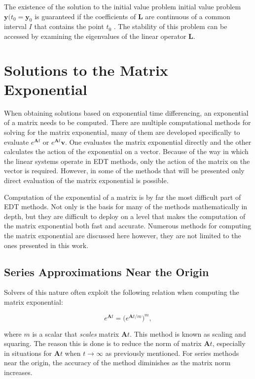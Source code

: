 The existence of the solution to the initial value problem initial value problem $\boldsymbol{y}(t_{0} = \boldsymbol{y}_{0}$ is guaranteed if the coefficients of $\boldsymbol{L}$ are continuous of a common interval $I$ that contains the point $t_{0}$ \cite{zill2012}. The stability of this problem can be accessed by examining the eigenvalues of the linear operator $\boldsymbol{L}$. 

\section{Solutions to the Matrix Exponential}
When obtaining solutions based on exponential time differencing, an exponential of a matrix needs to be computed. There are multiple computational methods for solving for the matrix exponential, many of them are developed specifically to evaluate $e^{\boldsymbol{A}t}$ or $e^{\boldsymbol{A}t}\boldsymbol{v}$. One evaluates the matrix exponential directly and the other calculates the action of the exponential on a vector. Because of the way in which the linear systems operate in EDT methods,  only the action of the matrix on the vector is required. However, in some of the methods that will be presented only direct evaluation of the matrix exponential is possible. 

Computation of the exponential of a matrix is by far the most difficult part of EDT methods. Not only is the basis for many of the methods mathematically in depth, but they are difficult to deploy on a level that makes the computation of the matrix exponential both fast and accurate. Numerous methods for computing the matrix exponential are discussed here however, they are not limited to the ones presented in this work. 

\subsection{Series Approximations Near the Origin} \label{subsec:seriesapprox}
Solvers of this nature often exploit the following relation when computing the matrix exponential:

\begin{equation}
    e^{\boldsymbol{A}t} = \big(e^{\boldsymbol{A}t/m}\big)^{m},
\end{equation}

\noindent where $m$ is a scalar that \textit{scales} matrix $\boldsymbol{A}t$. This method is known as scaling and squaring. The reason this is done is to reduce the norm of matrix $\boldsymbol{A}t$, especially in situations for $\boldsymbol{A}t$ when $t \rightarrow \infty$ as previously mentioned. For series methods near the origin, the accuracy of the method diminishes as the matrix norm increases. 


